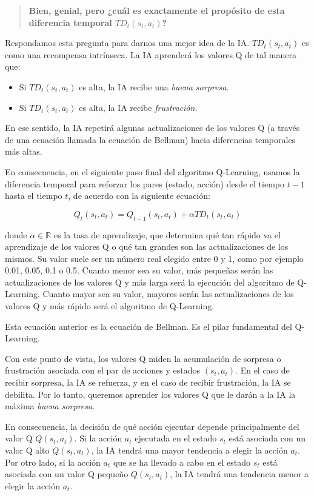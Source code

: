 \documentclass[
]{book}
\providecommand{\tightlist}{%
  \setlength{\itemsep}{0pt}\setlength{\parskip}{0pt}}
\begin{document}
\begin{quote}
\textbf{Bien, genial, pero ¿cuál es exactamente el propósito de esta diferencia temporal \(TD_t(s_t,a_t)\)?}
\end{quote}

Respondamos esta pregunta para darnos una mejor idea de la IA. \(TD_t (s_t, a_t)\) es como una recompensa intrínseca. La IA aprenderá los valores Q de tal manera que:

\begin{itemize}
\tightlist
\item
  Si \(TD_t(s_t,a_t)\) es alta, la IA recibe una \emph{buena sorpresa}.
\item
  Si \(TD_t(s_t,a_t)\) es alta, la IA recibe \emph{frustración}.
\end{itemize}

En ese sentido, la IA repetirá algunas actualizaciones de los valores Q (a través de una ecuación llamada la ecuación de Bellman) hacia diferencias temporales más altas.

En consecuencia, en el siguiente paso final del algoritmo Q-Learning, usamos la diferencia temporal para reforzar los pares (estado, acción) desde el tiempo \(t-1\) hasta el tiempo \(t\), de acuerdo con la siguiente ecuación:

\[Q_t(s_t,a_t) = Q_{t-1}(s_t,a_t) + \alpha TD_t(s_t,a_t)\]

donde \(\alpha \in \mathbb{R}\) es la tasa de aprendizaje, que determina qué tan rápido va el aprendizaje de los valores Q o qué tan grandes son las actualizaciones de los mismos. Su valor suele ser un número real elegido entre 0 y 1, como por ejemplo 0.01, 0.05, 0.1 o 0.5. Cuanto menor sea su valor, más pequeñas serán las actualizaciones de los valores Q y más larga será la ejecución del algoritmo de Q-Learning. Cuanto mayor sea su valor, mayores serán las actualizaciones de los valores Q y más rápido será el algoritmo de Q-Learning.

Esta ecuación anterior es la ecuación de Bellman. Es el pilar fundamental del Q-Learning.

Con este punto de vista, los valores Q miden la acumulación de sorpresa o frustración asociada con el par de acciones y estados \((s_t, a_t)\). En el caso de recibir sorpresa, la IA se refuerza, y en el caso de recibir frustración, la IA se debilita. Por lo tanto, queremos aprender los valores Q que le darán a la IA la máxima \emph{buena sorpresa}.

En consecuencia, la decisión de qué acción ejecutar depende principalmente del valor Q \(Q(s_t, a_t)\). Si la acción \(a_t\) ejecutada en el estado \(s_t\) está asociada con un valor Q alto \(Q (s_t, a_t)\), la IA tendrá una mayor tendencia a elegir la acción \(a_t\). Por otro lado, si la acción \(a_t\) que se ha llevado a cabo en el estado \(s_t\) está asociada con un valor Q pequeño \(Q(s_t, a_t)\), la IA tendrá una tendencia menor a elegir la acción \(a_t\).
\end{document}
